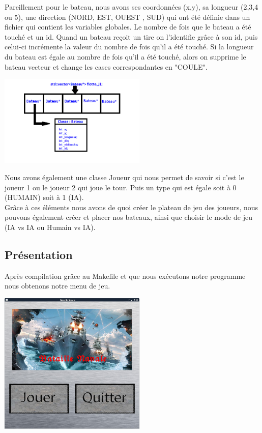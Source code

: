 \documentclass[a4paper,oneside]{article}
\begin{document}
Pareillement pour le bateau, nous avons ses coordonnées (x,y), sa longueur (2,3,4 ou 5), une direction (NORD, EST, OUEST , SUD) qui ont été définie dans un fichier qui contient les variables globales. Le nombre de fois que le bateau a été touché et un id.
Quand un bateau reçoit un tire on l'identifie grâce à son id, puis celui-ci incrémente la valeur du nombre de fois qu'il a été touché. Si la longueur du bateau est égale au nombre de fois qu'il a été touché, alors on supprime le bateau vecteur et change les cases correspondantes en "COULE".

\begin{center}
	\includegraphics[width=7cm]{VectorBateau.png} 
\end{center} 



Nous avons également une classe Joueur qui nous permet de savoir si c'est le joueur 1 ou le joueur 2 qui joue le tour. Puis un type qui est égale soit à 0 (HUMAIN) soit à 1 (IA). 
\newline
\\

Grâce à ces éléments nous avons de quoi créer le plateau de jeu des joueurs, nous pouvons également créer et placer nos bateaux, ainsi que choisir le mode de jeu (IA vs IA ou Humain vs IA).
 

\subsection{Présentation }
Après compilation grâce au Makefile et que nous exécutons notre programme nous obtenons notre menu de jeu.

\begin{center}
	\includegraphics[width=7cm]{menuPrincipal.png} 
\end{center} 
\end{document}
